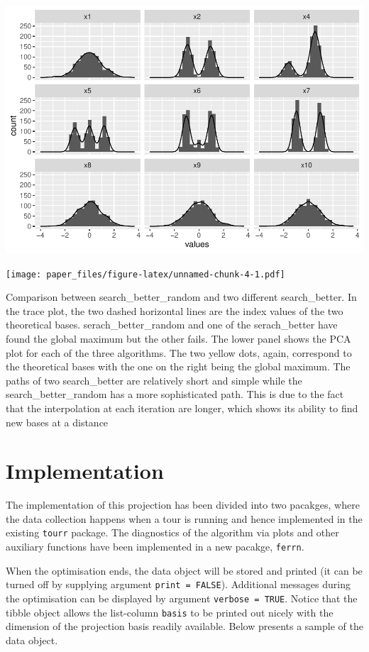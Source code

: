 \documentclass[12pt]{article}
\begin{document}
\includegraphics{paper_files/figure-latex/unnamed-chunk-3-1.pdf}

\texttt{[image: paper\_files/figure-latex/unnamed-chunk-4-1.pdf]}

Comparison between search\_better\_random and two different search\_better. In the trace plot, the two dashed horizontal lines are the index values of the two theoretical bases. serach\_better\_random and one of the serach\_better have found the global maximum but the other fails. The lower panel shows the PCA plot for each of the three algorithms. The two yellow dots, again, correspond to the theoretical bases with the one on the right being the global maximum. The paths of two search\_better are relatively short and simple while the search\_better\_random has a more sophisticated path. This is due to the fact that the interpolation at each iteration are longer, which shows its ability to find new bases at a distance

\hypertarget{implementation}{%
\section{Implementation}\label{implementation}}

The implementation of this projection has been divided into two pacakges, where the data collection happens when a tour is running and hence implemented in the existing \texttt{tourr} package. The diagnostics of the algorithm via plots and other auxiliary functions have been implemented in a new pacakge, \texttt{ferrn}.

When the optimisation ends, the data object will be stored and printed (it can be turned off by supplying argument \texttt{print\ =\ FALSE}). Additional messages during the optimisation can be displayed by argument \texttt{verbose\ =\ TRUE}. Notice that the tibble object allows the list-column \texttt{basis} to be printed out nicely with the dimension of the projection basis readily available. Below presents a sample of the data object.
\end{document}
